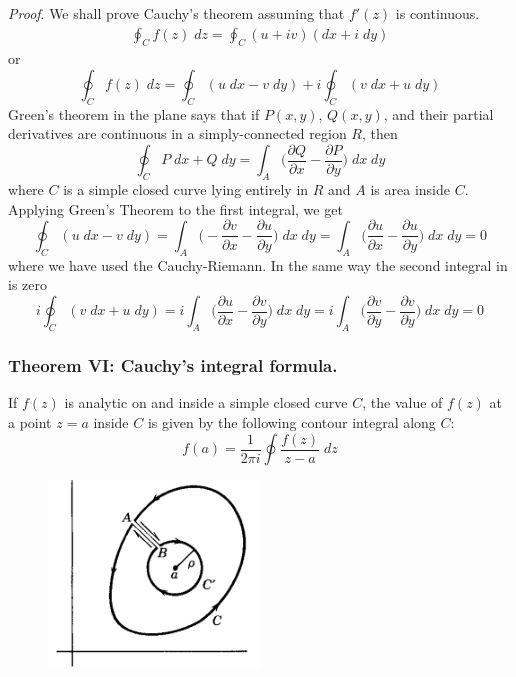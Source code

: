 \documentclass[../../../main.tex]{subfiles}
\begin{document}
\emph{Proof}. We shall prove Cauchy's theorem assuming that $f '(z)$ is continuous.
\begin{align*}
    \oint_C f(z) \;dz =\oint_C  (u + iv)(dx + i \;dy)
\end{align*}
or
\begin{equation*}
    \oint_C f(z) \;dz =\oint_C(u \;dx - v\; dy)+i\oint_C (v\; dx + u\; dy)
\end{equation*}
Green’s theorem in the plane says that if $P (x, y)$, $Q(x, y)$, and their partial derivatives are continuous in a simply-connected region $R$, then
\begin{equation*}
    \oint_C P\;dx+Q\;dy=\int_A \biggl(\frac{\partial Q}{\partial x}- \frac{\partial P}{\partial y}\biggr)\;dx\;dy
\end{equation*}
where $C$ is a simple closed curve lying entirely in $R$ and $A$ is area inside $C$. Applying Green's Theorem to the first integral, we get
\begin{equation*}
    \oint_C(u \;dx - v\; dy)=\int_A \biggl(-\frac{\partial v}{\partial x}- \frac{\partial u}{\partial y}\biggr)\;dx\;dy=\int_A \biggl(\frac{\partial u}{\partial x}- \frac{\partial u}{\partial y}\biggr)\;dx\;dy=0
\end{equation*}
where we have used the Cauchy-Riemann. In the same way the second integral in is zero
\begin{equation*}
    i\oint_C (v\; dx + u\; dy)=
    i\int_A \biggl(\frac{\partial u}{\partial x}- \frac{\partial v}{\partial y}\biggr)\;dx\;dy=
    i\int_A \biggl(\frac{\partial v}{\partial y}- \frac{\partial v}{\partial y}\biggr)\;dx\;dy=0
\end{equation*}

\subsubsection{Theorem VI: Cauchy's integral formula.} If $f(z)$ is analytic on and inside a simple closed curve $C$, the value of $f(z)$ at a point $z = a$ inside $C$ is given by the following contour integral along $C$:
\begin{equation*}
    f(a)=\frac{1}{2\pi i}\oint \frac{f(z)}{z-a}\;dz
\end{equation*}
\begin{figure}[h]
    \centering
    \includegraphics[width=0.5\textwidth]{../../../Rss/AnalyticsApproach/Com/Theo.png}
\end{figure}
\end{document}
